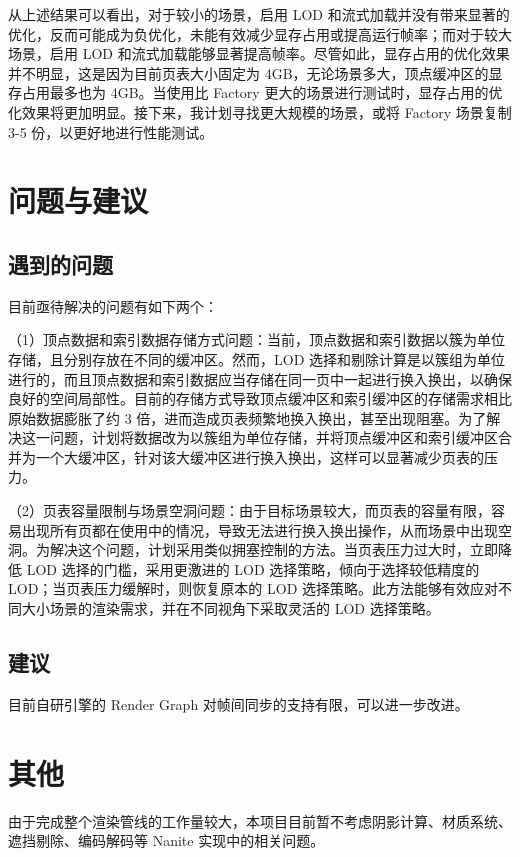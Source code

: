 从上述结果可以看出，对于较小的场景，启用 LOD 和流式加载并没有带来显著的优化，反而可能成为负优化，未能有效减少显存占用或提高运行帧率；而对于较大场景，启用 LOD 和流式加载能够显著提高帧率。尽管如此，显存占用的优化效果并不明显，这是因为目前页表大小固定为 4GB，无论场景多大，顶点缓冲区的显存占用最多也为 4GB。当使用比 Factory 更大的场景进行测试时，显存占用的优化效果将更加明显。接下来，我计划寻找更大规模的场景，或将 Factory 场景复制 3-5 份，以更好地进行性能测试。

\section{问题与建议}

\subsection{遇到的问题}

目前亟待解决的问题有如下两个：

（1）顶点数据和索引数据存储方式问题：当前，顶点数据和索引数据以簇为单位存储，且分别存放在不同的缓冲区。然而，LOD 选择和剔除计算是以簇组为单位进行的，而且顶点数据和索引数据应当存储在同一页中一起进行换入换出，以确保良好的空间局部性。目前的存储方式导致顶点缓冲区和索引缓冲区的存储需求相比原始数据膨胀了约 3 倍，进而造成页表频繁地换入换出，甚至出现阻塞。为了解决这一问题，计划将数据改为以簇组为单位存储，并将顶点缓冲区和索引缓冲区合并为一个大缓冲区，针对该大缓冲区进行换入换出，这样可以显著减少页表的压力。

（2）页表容量限制与场景空洞问题：由于目标场景较大，而页表的容量有限，容易出现所有页都在使用中的情况，导致无法进行换入换出操作，从而场景中出现空洞。为解决这个问题，计划采用类似拥塞控制的方法。当页表压力过大时，立即降低 LOD 选择的门槛，采用更激进的 LOD 选择策略，倾向于选择较低精度的 LOD；当页表压力缓解时，则恢复原本的 LOD 选择策略。此方法能够有效应对不同大小场景的渲染需求，并在不同视角下采取灵活的 LOD 选择策略。

\subsection{建议}

目前自研引擎的 Render Graph 对帧间同步的支持有限，可以进一步改进。

\section{其他}

由于完成整个渲染管线的工作量较大，本项目目前暂不考虑阴影计算、材质系统、遮挡剔除、编码解码等 Nanite 实现中的相关问题。